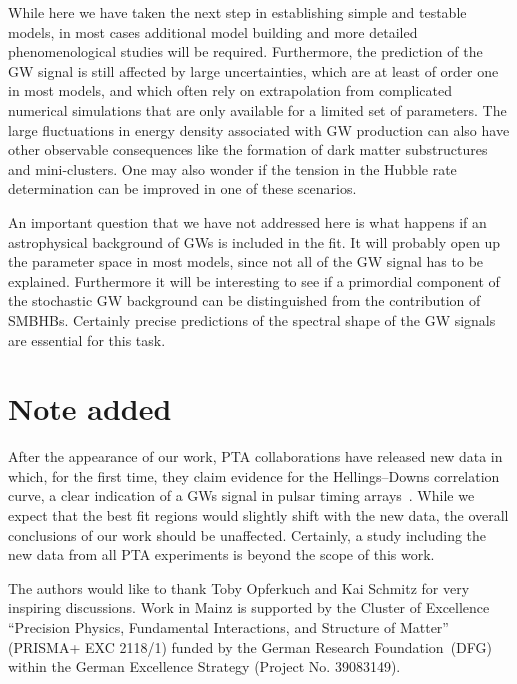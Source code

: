 \documentclass{article}
\begin{document}
While here we have taken the next step in establishing simple and testable models, in most cases additional model building and more detailed phenomenological studies will be required. Furthermore, the prediction of the GW signal is still affected by large uncertainties, which are at least of order one in most models, and which often rely on extrapolation from complicated numerical simulations that are only available for a limited set of parameters. The large fluctuations in energy density associated with GW production can also have other observable consequences like the formation of dark matter substructures and mini-clusters. One may also wonder if the tension in the Hubble rate determination can be improved in one of these scenarios. 

An important question that we have not addressed here is what happens if an astrophysical background of GWs is included in the fit. It will probably open up the parameter space in most models, since not all of the GW signal has to be explained. Furthermore it will be interesting to see if a primordial component of the stochastic GW background can be distinguished from the contribution of SMBHBs. Certainly precise predictions of the spectral shape of the GW signals are essential for this task. 




\section*{Note added}

After the appearance of our work, PTA collaborations have released new data in which, for the first time, they claim evidence for the Hellings–Downs correlation curve, a clear indication of a GWs signal in pulsar timing arrays~\cite{NANOGrav:2023gor, NANOGrav:2023hvm, Antoniadis:2023ott, Antoniadis:2023xlr, Reardon:2023gzh, Xu:2023wog}.
While we expect that the best fit regions would slightly shift with the new data, the overall conclusions of our work should be unaffected. Certainly, a study including the new data from all PTA experiments is beyond the scope of this work.

\acknowledgments%

The authors would like to thank Toby Opferkuch and Kai Schmitz for very inspiring discussions. 
Work in Mainz is supported by the Cluster of Excellence “Precision Physics, Fundamental Interactions, and Structure of Matter” (PRISMA+ EXC 2118/1) funded by the German Research Foundation~(DFG) within the German Excellence Strategy (Project No. 39083149).
\end{document}
